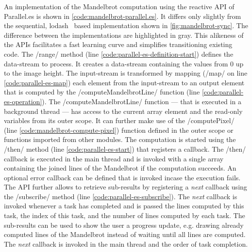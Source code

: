  An implementation of the Mandelbrot computation using the reactive API of Parallel.es is shown in \cref{code:mandelbrot-parallel.es}. It differs only slightly from the sequential, lodash~\cite{lodash} based implementation shown in \cref{fig:mandelbrot-sync}. The difference between the implementations are highlighted in gray. This alikeness of the APIs facilitates a fast learning curve and simplifies transitioning existing code. The \javascriptinline/range/ method (line \ref{code:parallel-es-definition-start}) defines the data-stream to process. It creates a data-stream containing the values from 0 up to the image height. The input-stream is transformed by mapping (\javascriptinline/map/ on line \ref{code:parallel-es-map}) each element from the input-stream to an output element that is computed by the \javascriptinline/computeMandelbrotLine/ function (line \ref{code:parallel-es-operation}). The \javascriptinline/computeMandelbrotLine/ function --- that is executed in a background thread --- has access to the current array element and the read-only variables from its outer scope. It can further make use of the \javascriptinline/computePixel/ (line \ref{code:mandelbrot-compute-pixel}) function defined in the outer scope or functions imported from other modules. The computation is started using the \javascriptinline/then/ method (line \ref{code:parallel-es-start}) that registers a callback. The \javascriptinline/then/ callback is executed in the main thread and is invoked with a single array containing the joined lines of the Mandelbrot if the computation succeeds. An optional error callback can be defined that is invoked incase the execution fails. The API further allows to retrieve sub-results by registering a \textit{next} callback using the \javascriptinline/subscribe/ method (line \ref{code:parallel-es-subscribe}). The \textit{next} callback is invoked whenever a task has completed and is passed the lines computed by this task, the index of this task, and the number of lines computed by each task. The sub-results can be used to show the user a progress update, e.g. drawing already computed lines of the Mandelbrot instead of waiting until all lines are computed. The \textit{next} callback is invoked in  the main thread and the order of task completion. 
 
